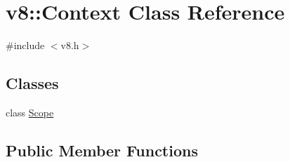 \hypertarget{classv8_1_1_context}{}\section{v8\+:\+:Context Class Reference}
\label{classv8_1_1_context}


{\ttfamily \#include $<$v8.\+h$>$}

\subsection*{Classes}
\begin{DoxyCompactItemize}
\item 
class \hyperlink{classv8_1_1_context_1_1_scope}{Scope}
\end{DoxyCompactItemize}
\subsection*{Public Member Functions}
